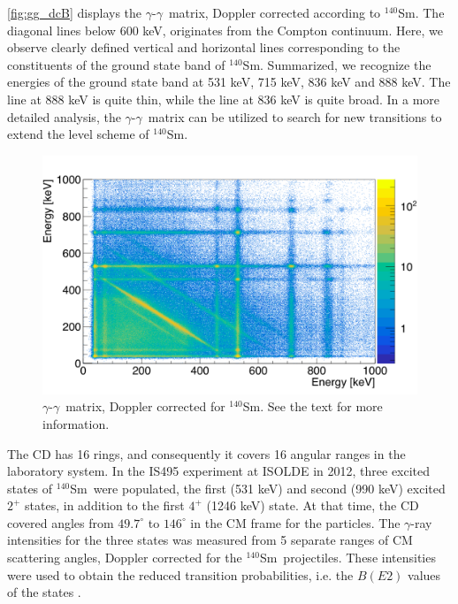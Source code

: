 \documentclass[twoside,english]{uiofysmaster/uiofysmaster}
\newcommand{\Sm}{$^{140}$Sm} %
\newcommand{\ga}{$\gamma$}
\let\orgautoref\autoref
\renewcommand{\autoref}
        {%
		 \def\sectionautorefname{Section}%
		 \def\subsectionautorefname{Section}%
		 \def\subsubsectionautorefname{Section}%
		 \def\chapterautorefname{Chapter}%
          \orgautoref}
\begin{document}
\autoref{fig:gg_dcB} displays the \ga-\ga\ matrix, Doppler corrected according to \Sm.
The diagonal lines below 600 keV, originates from the Compton continuum. 
Here, we observe clearly defined vertical and horizontal lines corresponding to the constituents of the ground state band of \Sm. 
Summarized, we recognize the energies of the ground state band at 531 keV, 715 keV, 836 keV and 888 keV. The line at 888 keV is quite thin, while the line at 836 keV is quite broad. 
In a more detailed analysis, the \ga-\ga\ matrix can be utilized to search for new transitions to extend the level scheme of \Sm.


\begin{figure}[htb!]
	\centering
	\includegraphics[width=\textwidth]{../Plots/plotting/gg_dcB.png}
	\caption{\ga-\ga\ matrix, Doppler corrected for \Sm. 
	See the text for more information.}
	\label{fig:gg_dcB}
\end{figure}


The CD has 16 rings, and consequently it covers 16 angular ranges in the laboratory system.
In the IS495 experiment at ISOLDE in 2012, three excited states of \Sm\ were populated, the first (531 keV) and second (990 keV) excited $2^+$ states, in addition to the first $4^+$ (1246 keV) state.
At that time, the CD covered angles from $49.7^\circ$ to $146^\circ$ in the CM frame for the particles.
The \ga-ray intensities for the three states was measured from 5 separate ranges of CM scattering angles, Doppler corrected for the \Sm\ projectiles. 
These intensities were used to obtain the reduced transition probabilities, i.e. the $B(E2)$ values of the states \cite{Klintefjord2015, Klintefjord2016, BelloGarrote2015}.
\end{document}

